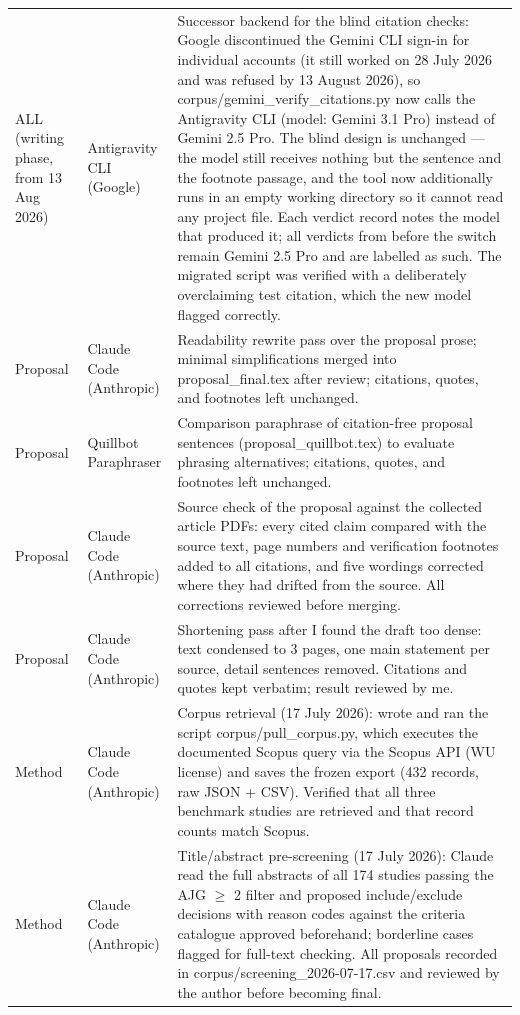 \begin{longtable}{@{}p{2.9cm}p{3.2cm}p{9.0cm}@{}}
\addlinespace
ALL (writing phase, from 13 Aug 2026) & Antigravity CLI (Google) & Successor backend for the blind citation checks: Google discontinued the Gemini CLI sign-in for individual accounts (it still worked on 28 July 2026 and was refused by 13 August 2026), so corpus/gemini\_verify\_citations.py now calls the Antigravity CLI (model: Gemini 3.1 Pro) instead of Gemini 2.5 Pro. The blind design is unchanged --- the model still receives nothing but the sentence and the footnote passage, and the tool now additionally runs in an empty working directory so it cannot read any project file. Each verdict record notes the model that produced it; all verdicts from before the switch remain Gemini 2.5 Pro and are labelled as such. The migrated script was verified with a deliberately overclaiming test citation, which the new model flagged correctly. \\
\addlinespace
Proposal & Claude Code (Anthropic) & Readability rewrite pass over the proposal prose; minimal simplifications merged into proposal\_final.tex after review; citations, quotes, and footnotes left unchanged. \\
\addlinespace
Proposal & Quillbot Paraphraser & Comparison paraphrase of citation-free proposal sentences (proposal\_quillbot.tex) to evaluate phrasing alternatives; citations, quotes, and footnotes left unchanged. \\
\addlinespace
Proposal & Claude Code (Anthropic) & Source check of the proposal against the collected article PDFs: every cited claim compared with the source text, page numbers and verification footnotes added to all citations, and five wordings corrected where they had drifted from the source. All corrections reviewed before merging. \\
\addlinespace
Proposal & Claude Code (Anthropic) & Shortening pass after I found the draft too dense: text condensed to 3 pages, one main statement per source, detail sentences removed. Citations and quotes kept verbatim; result reviewed by me. \\
\addlinespace
Method & Claude Code (Anthropic) & Corpus retrieval (17 July 2026): wrote and ran the script corpus/pull\_corpus.py, which executes the documented Scopus query via the Scopus API (WU license) and saves the frozen export (432 records, raw JSON + CSV). Verified that all three benchmark studies are retrieved and that record counts match Scopus. \\
\addlinespace
Method & Claude Code (Anthropic) & Title/abstract pre-screening (17 July 2026): Claude read the full abstracts of all 174 studies passing the AJG $\geq$ 2 filter and proposed include/exclude decisions with reason codes against the criteria catalogue approved beforehand; borderline cases flagged for full-text checking. All proposals recorded in corpus/screening\_2026-07-17.csv and reviewed by the author before becoming final. \\

\end{longtable}
